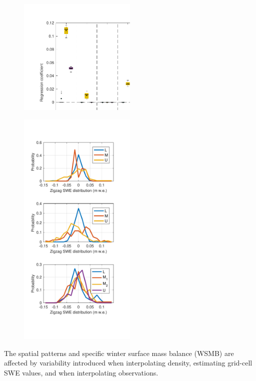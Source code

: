 \documentclass[twocolumn,letterpaper]{igs}
\begin{document}
\begin{figure}
	\centering
	\includegraphics[width =0.5\textwidth]{BetaCoeffs.pdf}\\
	\caption{}
	\label{fig:BetaCoeffs}
\end{figure}

\begin{figure}
	\centering
	\includegraphics[width =0.5\textwidth]{ZigzagHistogram.pdf}\\
	\caption{}
	\label{fig:ZigzagHistogram}
\end{figure}


The spatial patterns and specific winter surface mass balance (WSMB) are affected by variability introduced when interpolating density, estimating grid-cell SWE values, and when interpolating observations.  
\end{document}
